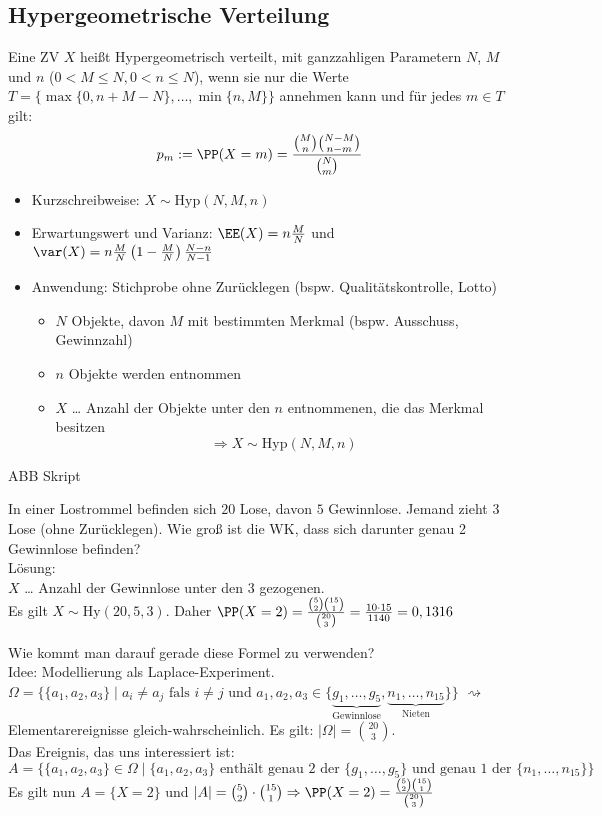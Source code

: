 \subsection{Hypergeometrische Verteilung}
 Eine ZV $X$ heißt Hypergeometrisch verteilt, mit ganzzahligen Parametern $N$, $M$ und $n$ ($0<M\leq N, 0 < n \leq N$), wenn sie nur die Werte $T=\{\max\{0,n+M-N\}, \dots, \min\{n,M\}\}$ annehmen kann und für jedes $m \in T$ gilt:
$$p_m:=\PP(X=m)=\frac{\binom{M}{n}\binom{N-M}{n-m}}{\binom{N}{m}}$$

\begin{itemize}
\item Kurzschreibweise: $X\sim \mathrm{Hyp}(N,M,n)$
\item Erwartungswert und Varianz: $\EE(X)=n\frac{M}{N}$ und $\var (X)=n\frac{M}{N}\left(1-\frac{M}{N}\right) \frac{N-n}{N-1}$
\item Anwendung: Stichprobe ohne Zurücklegen (bspw. Qualitätskontrolle, Lotto)
\begin{itemize}
\item $N$ Objekte, davon $M$ mit bestimmten Merkmal (bspw. Ausschuss, Gewinnzahl)
\item $n$ Objekte werden entnommen
\item $X$ … Anzahl der Objekte unter den $n$ entnommenen, die das Merkmal besitzen
$$\Rightarrow X\sim \mathrm{Hyp}(N,M,n)$$
\end{itemize}
\end{itemize}
ABB Skript

 In einer Lostrommel befinden sich $20$ Lose, davon $5$ Gewinnlose. Jemand zieht $3$ Lose (ohne Zurücklegen). Wie groß ist die WK, dass sich darunter genau 2 Gewinnlose befinden?\\
Lösung:\\
$X$ … Anzahl der Gewinnlose unter den $3$ gezogenen.\\
Es gilt $X \sim \mathrm{Hy}(20,5,3)$. Daher 
$\PP(X=2)=\frac{\binom{5}{2}\binom{15}{1}}{\binom{20}{3}}=\frac{10 \cdot 15}{1140}=0,1316$

 Wie kommt man darauf gerade diese Formel zu verwenden?\\
Idee: Modellierung als Laplace-Experiment.\\
$\Omega=\{\{a_1,a_2,a_3\}\;|\; a_i \not = a_j \text{ fals } i \not = j \text{ und }a_1, a_2, a_3 \in \{\underbrace{g_1, \dots, g_5}_{\text{Gewinnlose}}, \underbrace{n_1, \dots, n_{15}}_{\text{Nieten}}\}\}$ $\rightsquigarrow $ Elementarereignisse gleich-wahrscheinlich. Es gilt: $|\Omega|=\binom{20}{3}$.\\
Das Ereignis, das uns interessiert ist: \\
$A=\{\{a_1, a_2, a_3\}\in \Omega \;|\; \{a_1, a_2, a_3\} \text{ enthält genau 2 der }\{g_1, \dots,g_5\}\text{ und genau 1 der }\{n_1,\dots,n_{15}\}\}$\\
Es gilt nun $A=\{X=2\}$ und $|A| = \binom{5}{2}\cdot \binom{15}{1} \Rightarrow \PP(X=2) = \frac{\binom{5}{2}\binom{15}{1}}{\binom{20}{3}}$

